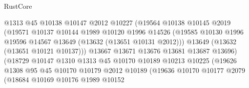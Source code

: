 \begin{lexlean}{RustCore}
\begin{coremodule}
                                  @1313
                                  @45
                                  @10138
                                  @10147
                                  @2012
                                  @10227
                                  (@19564
                                    @10138
                                    @10145
                                    @2019
                                    (@19571
                                      @10137
                                      @10144
                                      @1989
                                      @10120
                                      @1996
                                      @14526
                                      (@19585
                                        @10130
                                        @1996
                                        @19596
                                        @14567
                                        @13649
                                        (@13632 (@13651 @10131 @2012)))
                                      @13649
                                      (@13632 (@13651 @10121 @10137)))
                                    @13667
                                    @13671
                                    @13676
                                    @13681
                                    @13687
                                    @13696)
                                  (@18729
                                    @10147
                                    @1310
                                    @1313
                                    @45
                                    @10170
                                    @10189
                                    @10213
                                    @10225
                                    (@19626
                                      @1308
                                      @95
                                      @45
                                      @10170
                                      @10179
                                      @2012
                                      @10189
                                      (@19636
                                        @10170
                                        @10177
                                        @2079
                                        (@18684
                                          @10169
                                          @10176
                                          @1989
                                          @10152

\end{coremodule}
\end{lexlean}
